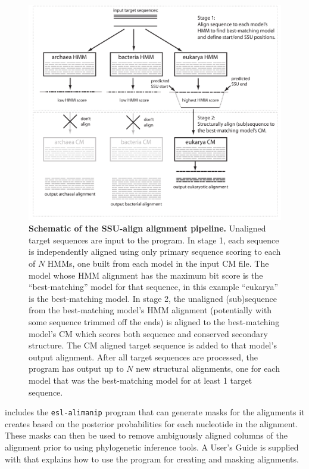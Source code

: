 \begin{figure}
  \begin{center}
\includegraphics[width=6.5in]{Figures/ssualign-schematic}
        \caption[Schematic of the  alignment
          pipeline]{\textbf{Schematic of the SSU-align
          alignment pipeline.} Unaligned target sequences are input to
        the program. In stage 1, each sequence is independently
        aligned using only primary sequence scoring to each of $N$
        HMMs, one built from each model in the input CM file. The
        model whose HMM alignment has the maximum bit score is the
        ``best-matching'' model for that sequence, in this example
        ``eukarya'' is the best-matching model. In stage 2, the
        unaligned (sub)sequence from the best-matching model's HMM
        alignment (potentially with some sequence trimmed off the
        ends) is aligned to the best-matching model's CM which scores
        both sequence and conserved secondary structure. The CM
        aligned target sequence is added to that model's output
        alignment. After all target sequences are processed, the
        program has output up to $N$ new structural alignments, one
        for each model that was the best-matching model for at least 1
        target sequence.}
  \end{center}
\label{fig:ssualign}
\end{figure}

 includes the {\tt esl-alimanip} program that can
generate masks for the alignments it creates based on the posterior
probabilities for each nucleotide in the alignment. These masks can then
be used to remove ambiguously aligned columns of the alignment prior
to using phylogenetic inference tools. %
A User's Guide is supplied with  that
explains how to use the program for creating and masking alignments.

